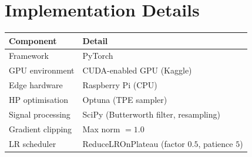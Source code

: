 \documentclass[conference]{IEEEtran}
\begin{document}
\section*{Implementation Details}

\begin{table}[H]
\centering
\begin{tabular}{ll}
\toprule
\textbf{Component} & \textbf{Detail} \\
\midrule
Framework             & PyTorch                                  \\
GPU environment       & CUDA-enabled GPU (Kaggle)                \\
Edge hardware         & Raspberry Pi (CPU)                       \\
HP optimisation       & Optuna (TPE sampler)                     \\
Signal processing     & SciPy (Butterworth filter, resampling)   \\
Gradient clipping     & Max norm $= 1.0$                         \\
LR scheduler          & ReduceLROnPlateau (factor $0.5$, patience $5$) \\
\bottomrule
\end{tabular}
\end{table}

% 
% 
\end{document}
